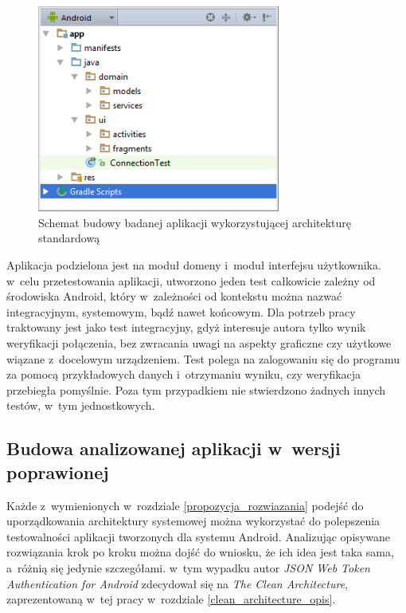 \begin{figure}[!htb]
    \centering
    \includegraphics[width=8cm]{imgs/ch6_app_st.png}
    \caption
{Schemat budowy badanej aplikacji wykorzystującej architekturę standardową}
    \label{fig:app_std}
\end{figure} 

Aplikacja podzielona jest na moduł domeny i~moduł interfejsu użytkownika. w~celu przetestowania aplikacji, utworzono jeden test całkowicie zależny od środowiska Android, który w~zależności od kontekstu można nazwać integracyjnym, systemowym, bądź nawet końcowym. Dla potrzeb pracy traktowany jest jako test integracyjny, gdyż interesuje autora tylko wynik weryfikacji połączenia, bez zwracania uwagi na aspekty graficzne czy użytkowe wiązane z~docelowym urządzeniem. Test polega na zalogowaniu się do programu za pomocą przykładowych danych i~otrzymaniu wyniku, czy weryfikacja przebiegła pomyślnie. Poza tym przypadkiem nie stwierdzono żadnych innych testów, w~tym jednostkowych.

\subsection{Budowa analizowanej aplikacji w~wersji poprawionej}
Każde z~wymienionych w~rozdziale \ref{propozycja_rozwiazania} podejść do uporządkowania architektury systemowej można wykorzystać do polepszenia testowalności aplikacji tworzonych dla systemu Android. Analizując opisywane rozwiązania krok po kroku można dojść do wniosku, że ich idea jest taka sama, a~różnią się jedynie szczegółami. w~tym wypadku autor \textit{JSON Web Token Authentication for Android} zdecydował się na \textit{The Clean Architecture}, zaprezentowaną w~tej pracy w~rozdziale \ref{clean_architecture_opis}.

